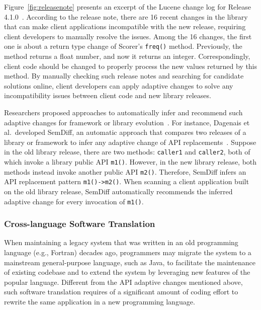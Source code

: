 \documentclass[runningheads,a4paper]{llncs}
\newcommand{\codefont}[1]{\footnotesize{\texttt{#1}}\normalsize}
\begin{document}
Figure~\ref{fig:releasenote} presents an excerpt of the Lucene change log for Release 4.1.0~\cite{releasenote}. According to the release note, there are 16 recent changes in the library that can make client applications incompatible with the new release, requiring client developers to manually resolve the issues. Among the 16 changes, the first one is about a return type change of Scorer's \codefont{freq()} method. Previously, the method returns a float number, and now it returns an integer. Correspondingly, client code should be changed to properly process the new values returned by this method. By manually checking such release notes and searching for candidate solutions online, client developers can apply adaptive changes to solve any incompatibility issues between client code and new library releases.

Researchers proposed approaches to automatically infer and recommend such adaptive changes for framework or library evolution~\cite{Dagenais2008:RAC,Schafer2008:MFU,Zhong2009:MMR,Wu2010:AHA,Nguyen2010:GAA}. For instance, Dagenais et al.~developed SemDiff, an automatic approach that compares two releases of a library or framework to infer any adaptive change of API replacements~\cite{Dagenais2008:RAC}. 
Suppose in the old library release, there are two methods: \codefont{caller1} and \codefont{caller2}, both of which invoke a library public API \codefont{m1()}. However, in the new library release, both methods instead invoke another public API \codefont{m2()}. Therefore, SemDiff infers an API replacement pattern \codefont{m1()->m2()}. When scanning a client application built on the old library release, SemDiff automatically recommends the inferred adaptive change for every invocation of \codefont{m1()}.

\subsubsection{Cross-language Software Translation}
When maintaining a legacy system that was written in an old programming language (e.g., Fortran) decades ago, programmers may migrate the system to a mainstream general-purpose language, such as Java, to facilitate the maintenance of existing codebase and to extend the system by leveraging new features of the popular language. Different from the API adaptive changes mentioned above, such software translation requires of a significant amount of coding effort to rewrite the same application in a new programming language.
\end{document}
